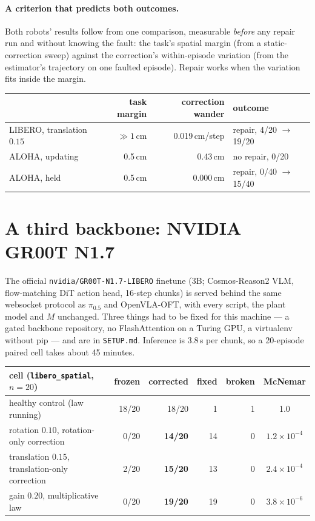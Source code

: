 \documentclass[11pt,a4paper]{article}
\newcommand{\code}[1]{\texttt{\small #1}}
\begin{document}
\paragraph{A criterion that predicts both outcomes.}
Both robots' results follow from one comparison, measurable \emph{before} any repair run and
without knowing the fault: the task's spatial margin (from a static-correction sweep) against
the correction's within-episode variation (from the estimator's trajectory on one faulted
episode). Repair works when the variation fits inside the margin.

\begin{center}
\begin{tabular}{lrrl}
\toprule
& task margin & correction wander & outcome \\
\midrule
LIBERO, translation $0.15$ & $\gg 1$\,cm & 0.019\,cm/step & repair, 4/20 $\to$ 19/20 \\
ALOHA, updating & 0.5\,cm & 0.43\,cm & no repair, 0/20 \\
ALOHA, held & 0.5\,cm & 0.000\,cm & repair, 0/40 $\to$ 15/40 \\
\bottomrule
\end{tabular}
\end{center}

\section{A third backbone: NVIDIA GR00T N1.7}
\label{sec:groot}

The official \code{nvidia/GR00T-N1.7-LIBERO} finetune (3B; Cosmos-Reason2 VLM, flow-matching
DiT action head, 16-step chunks) is served behind the same websocket protocol as $\pi_{0.5}$
and OpenVLA-OFT, with every script, the plant model and $M$ unchanged. Three things had to be
fixed for this machine --- a gated backbone repository, no FlashAttention on a Turing GPU,
a virtualenv without pip --- and are in \code{SETUP.md}. Inference is 3.8\,s per chunk, so a
20-episode paired cell takes about 45 minutes.

\begin{center}\small
\begin{tabular}{lrrrrc}
\toprule
cell (\code{libero\_spatial}, $n=20$) & frozen & corrected & fixed & broken & McNemar \\
\midrule
healthy control (law running) & 18/20 & 18/20 & 1 & 1 & 1.0 \\
rotation $0.10$, rotation-only correction & 0/20 & \textbf{14/20} & 14 & 0 & $1.2\times10^{-4}$ \\
translation $0.15$, translation-only correction & 2/20 & \textbf{15/20} & 13 & 0 & $2.4\times10^{-4}$ \\
gain $0.20$, multiplicative law & 0/20 & \textbf{19/20} & 19 & 0 & $3.8\times10^{-6}$ \\
\bottomrule
\end{tabular}
\end{center}
\end{document}
